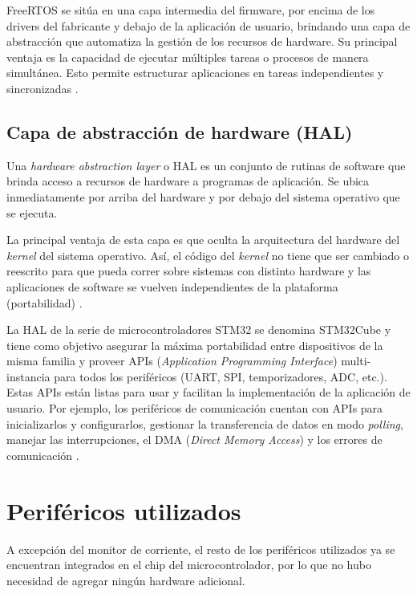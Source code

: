FreeRTOS se sitúa en una capa intermedia del firmware, por encima de los drivers del fabricante y debajo de la aplicación de usuario, brindando una capa de abstracción que automatiza la gestión de los recursos de hardware. Su principal ventaja es la capacidad de ejecutar múltiples tareas o procesos de manera simultánea. Esto permite estructurar aplicaciones en tareas independientes y sincronizadas \citep{WEBSITE:FREERTOS}.

\subsection{Capa de abstracción de hardware (HAL)}

Una \textit{hardware abstraction layer} o HAL es un conjunto de rutinas de software que brinda acceso a recursos de hardware a programas de aplicación. Se ubica inmediatamente por arriba del hardware y por debajo del sistema operativo que se ejecuta.

La principal ventaja de esta capa es que oculta la arquitectura del hardware del \textit{kernel} del sistema operativo. Así, el código del \textit{kernel} no tiene que ser cambiado o reescrito para que pueda correr sobre sistemas con distinto hardware y las aplicaciones de software se vuelven independientes de la plataforma (portabilidad) \citep{WEBSITE:HAL}.

La HAL de la serie de microcontroladores STM32 se denomina STM32Cube y tiene como objetivo asegurar la máxima portabilidad entre dispositivos de la misma familia y proveer APIs (\textit{Application Programming Interface}) multi-instancia para todos los periféricos (UART, SPI, temporizadores, ADC, etc.). Estas APIs están listas para usar y facilitan la implementación de la aplicación de usuario. Por ejemplo, los periféricos de comunicación cuentan con APIs para inicializarlos y configurarlos, gestionar la transferencia de datos en modo \textit{polling}, manejar las interrupciones, el DMA (\textit{Direct Memory Access}) y los errores de comunicación \citep{WEBSITE:STM32CUBE}.

\section{Periféricos utilizados}

A excepción del monitor de corriente, el resto de los periféricos utilizados ya se encuentran integrados en el chip del microcontrolador, por lo que no hubo necesidad de agregar ningún hardware adicional.


